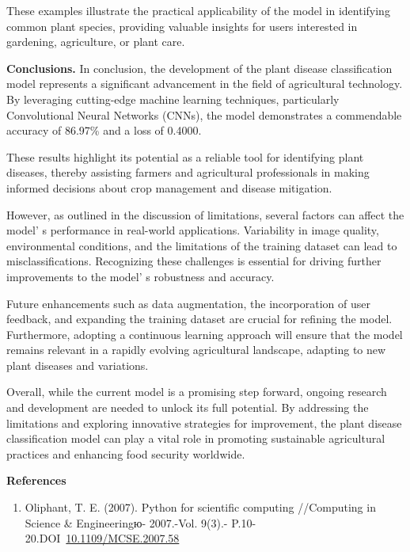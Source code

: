 {{These examples illustrate the practical applicability of the model in
identifying common plant species, providing valuable insights for users
interested in gardening, agriculture, or plant care.

{\bfseries Conclusions.} In conclusion, the development of the plant
disease classification model represents a significant advancement in the
field of agricultural technology. By leveraging cutting-edge machine
learning techniques, particularly Convolutional Neural Networks (CNNs),
the model demonstrates a commendable accuracy of 86.97\% and a loss of
0.4000.

These results highlight its potential as a reliable tool for identifying
plant diseases, thereby assisting farmers and agricultural professionals
in making informed decisions about crop management and disease
mitigation.

However, as outlined in the discussion of limitations, several factors
can affect the model' s performance in real-world
applications. Variability in image quality, environmental conditions,
and the limitations of the training dataset can lead to
misclassifications. Recognizing these challenges is essential for
driving further improvements to the model' s robustness
and accuracy.

Future enhancements such as data augmentation, the incorporation of user
feedback, and expanding the training dataset are crucial for refining
the model. Furthermore, adopting a continuous learning approach will
ensure that the model remains relevant in a rapidly evolving
agricultural landscape, adapting to new plant diseases and variations.

Overall, while the current model is a promising step forward, ongoing
research and development are needed to unlock its full potential. By
addressing the limitations and exploring innovative strategies for
improvement, the plant disease classification model can play a vital
role in promoting sustainable agricultural practices and enhancing food
security worldwide.

{\bfseries References}

\begin{enumerate}
\def\labelenumi{\arabic{enumi}.}
\item
  Oliphant, T. E. (2007). Python for scientific computing //Computing in
  Science \& Engineeringю- 2007.-Vol. 9(3).-
  P.10-20.DOI~\href{https://doi.org/10.1109/MCSE.2007.58}{10.1109/MCSE.2007.58}
\end{enumerate}

}}
